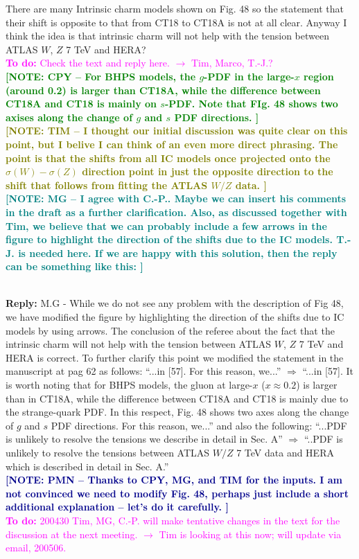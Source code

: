 \documentclass[aps,prd,amsmath,nofootinbib,floatfix,fleqn]{revtex4}
\newcommand{\TODO}[1]{\textcolor{magenta}{
\quad\vspace{3pt} \\ {\bf To do:} #1 \\
}}
\newcommand{\REPLY}[1]{\textcolor{redish}{\quad \\
{\bf Reply:} #1 \\
}}
\newcommand{\NOTECPY}[1]{\textcolor{green}{ \bf[NOTE: CPY -- #1 ]}}
\newcommand{\NOTEPN}[1]{\textcolor{darkblue}{ \bf[NOTE: PMN -- #1 ]}}
\newcommand{\NOTETIM}[1]{\textcolor{olive}{ \bf[NOTE: TIM -- #1 ]}}
\newcommand{\NOTEMG}[1]{\textcolor{teal}{ \bf[NOTE: MG -- #1 ]}}
\begin{document}
There are many Intrinsic charm models shown on Fig. 48 so the statement that their shift is opposite to that from CT18 to CT18A is not at all clear. Anyway I think the idea is that intrinsic charm will not help with the tension between ATLAS $W$, $Z$ 7 TeV and HERA?  
\TODO{Check the text and reply here. $\to$ Tim, Marco, T.-J.?}
\NOTECPY{For BHPS models, the $g$-PDF in the large-$x$ region (around 0.2) is larger than CT18A, while the difference between CT18A and CT18 is mainly on $s$-PDF. Note that FIg. 48 shows two axises along the change of $g$ and $s$ PDF directions.}\\
%
\NOTETIM{I thought our initial discussion was quite clear on this point, but I belive I can
think of an even more direct phrasing.  The point is that the shifts from all IC models
once projected onto the $\sigma(W)-\sigma(Z)$ direction point in just the opposite
direction to the shift that follows from fitting the ATLAS $W/Z$ data.}\\
\NOTEMG{I agree with C.-P.. Maybe we can insert his comments in the draft as a further clarification.
Also, as discussed together with Tim, we believe that we can probably include a few arrows in the figure to highlight the direction of the shifts due to the IC models.
T.-J. is needed here. If we are happy with this solution, then the reply can be something like this:}

\REPLY{M.G - While we do not see any problem with the description of Fig 48, we have modified the figure
by highlighting the direction of the shifts due to IC models by using arrows. The conclusion of the referee about the fact that
the intrinsic charm will not help with the tension between ATLAS $W$, $Z$ 7 TeV and HERA is correct.
\newline
%
To further clarify this point we modified the statement in the manuscript at pag 62 as follows:
\newline
\newline
``...in [57]. For this reason, we...'' $\Longrightarrow$ ``...in [57]. It is worth noting that for BHPS models, the gluon at large-$x$ ($x\approx 0.2$) is larger than in CT18A,
while the difference between CT18A and CT18 is mainly due to the strange-quark PDF. In this respect, Fig. 48 shows two axes along the change of $g$ and $s$ PDF directions.
For this reason, we...''
\newline
\newline
and also the following:
\newline
\newline
``...PDF is unlikely to resolve the tensions we describe in detail in Sec. A'' $\Longrightarrow$ ``..PDF is unlikely to resolve the tensions between ATLAS $W/Z$ 7 TeV data
and HERA which is described in detail in Sec. A.''}
\NOTEPN{Thanks to CPY, MG, and TIM for the inputs. I am not convinced we need to modify Fig. 48, perhaps just include a short additional  explanation -- let's do it carefully.}
\TODO{200430 Tim, MG, C.-P. will make tentative changes in the text for the discussion at the next meeting. $\to$ Tim is looking at this now; will update via email, 200506.}
\end{document}
